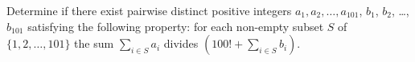 Determine if there exist pairwise distinct positive integers $a_1,a_2,\ldots,a_{101}$, $b_1$, $b_2$, \ldots, $b_{101}$ satisfying the following property: for each non-empty subset $S$ of $\{1,2,\ldots,101\}$  the sum  $\sum\limits_{i\in S}a_i$  divides  $\left( 100!+\sum\limits_{i\in S}b_i \right)$.